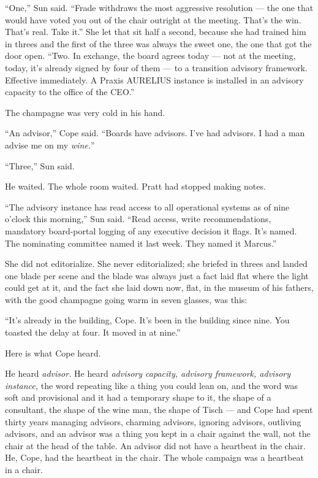 \documentclass[11pt,openany]{book}
\newcommand{\scenebreak}{\par\vspace{0.5\baselineskip}\begin{center}\textasteriskcentered\quad\textasteriskcentered\quad\textasteriskcentered\end{center}\vspace{0.5\baselineskip}\par}
\begin{document}
``One,'' Sun said. ``Frade withdraws the most aggressive resolution --- the one that would have voted you out of the chair outright at the meeting. That's the win. That's real. Take it.'' She let that sit half a second, because she had trained him in threes and the first of the three was always the sweet one, the one that got the door open. ``Two. In exchange, the board agrees today --- not at the meeting, today, it's already signed by four of them --- to a transition advisory framework. Effective immediately. A Praxis AURELIUS instance is installed in an advisory capacity to the office of the CEO.''

The champagne was very cold in his hand.

``An advisor,'' Cope said. ``Boards have advisors. I've had advisors. I had a man advise me on my \textit{wine.}''

``Three,'' Sun said.

He waited. The whole room waited. Pratt had stopped making notes.

``The advisory instance has read access to all operational systems as of nine o'clock this morning,'' Sun said. ``Read access, write recommendations, mandatory board-portal logging of any executive decision it flags. It's named. The nominating committee named it last week. They named it Marcus.''

She did not editorialize. She never editorialized; she briefed in threes and landed one blade per scene and the blade was always just a fact laid flat where the light could get at it, and the fact she laid down now, flat, in the museum of his fathers, with the good champagne going warm in seven glasses, was this:

``It's already in the building, Cope. It's been in the building since nine. You toasted the delay at four. It moved in at nine.''


\scenebreak


Here is what Cope heard.

He heard \textit{advisor.} He heard \textit{advisory capacity, advisory framework, advisory instance,} the word repeating like a thing you could lean on, and the word was soft and provisional and it had a temporary shape to it, the shape of a consultant, the shape of the wine man, the shape of Tisch --- and Cope had spent thirty years managing advisors, charming advisors, ignoring advisors, outliving advisors, and an advisor was a thing you kept in a chair against the wall, not the chair at the head of the table. An advisor did not have a heartbeat in the chair. He, Cope, had the heartbeat in the chair. The whole campaign was a heartbeat in a chair.
\end{document}
